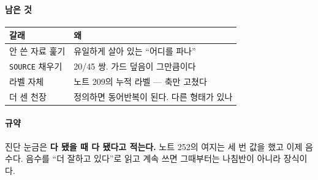 \documentclass[10pt]{article}
\begin{document}
\paragraph{남은 것}
\begin{center}\small
\begin{tabular}{ll}
\hline
갈래 & 왜 \\
\hline
안 쓴 자료 훑기 & 유일하게 살아 있는 ``어디를 파나'' \\
\texttt{SOURCE} 채우기 & 20/45 쌍. 가드 덮음이 그만큼이다 \\
라벨 자체 & 노트 209의 누적 라벨 --- 축만 고쳤다 \\
더 센 천장 & 정의하면 동어반복이 된다. 다른 형태가 있나 \\
\hline
\end{tabular}
\end{center}

\paragraph{규약} 진단 눈금은 \textbf{다 됐을 때 다 됐다고 적는다.} 노트 252의
여지는 세 번 값을 했고 이제 음수다. 음수를 ``더 잘하고 있다''로 읽고 계속
쓰면 그때부터는 나침반이 아니라 장식이다.
\end{document}
